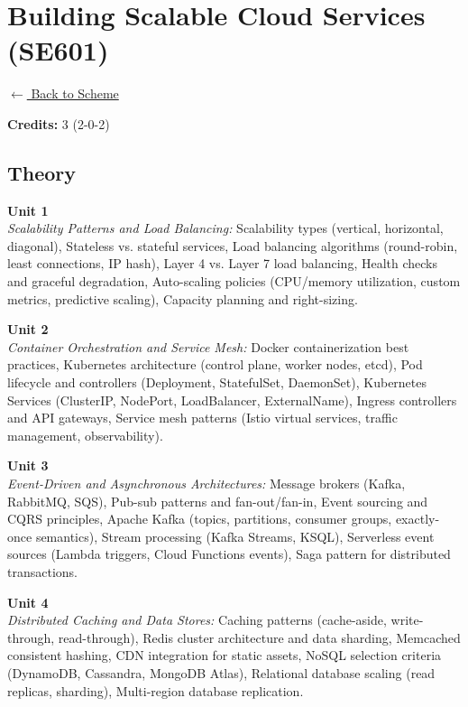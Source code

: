 \section*{Building Scalable Cloud Services (SE601)}
\label{major:SE_6}

\noindent \small{\hyperref[main:scheme]{$\leftarrow$ Back to Scheme}} \vspace{0.5cm}

\noindent \textbf{Credits:} 3 (2-0-2)

\subsection*{Theory}
\noindent\textbf{Unit 1} \\
\textit{Scalability Patterns and Load Balancing:} Scalability types (vertical, horizontal, diagonal), Stateless vs. stateful services, Load balancing algorithms (round-robin, least connections, IP hash), Layer 4 vs. Layer 7 load balancing, Health checks and graceful degradation, Auto-scaling policies (CPU/memory utilization, custom metrics, predictive scaling), Capacity planning and right-sizing.

\vspace{0.3cm}

\noindent\textbf{Unit 2} \\
\textit{Container Orchestration and Service Mesh:} Docker containerization best practices, Kubernetes architecture (control plane, worker nodes, etcd), Pod lifecycle and controllers (Deployment, StatefulSet, DaemonSet), Kubernetes Services (ClusterIP, NodePort, LoadBalancer, ExternalName), Ingress controllers and API gateways, Service mesh patterns (Istio virtual services, traffic management, observability).

\vspace{0.3cm}

\noindent\textbf{Unit 3} \\
\textit{Event-Driven and Asynchronous Architectures:} Message brokers (Kafka, RabbitMQ, SQS), Pub-sub patterns and fan-out/fan-in, Event sourcing and CQRS principles, Apache Kafka (topics, partitions, consumer groups, exactly-once semantics), Stream processing (Kafka Streams, KSQL), Serverless event sources (Lambda triggers, Cloud Functions events), Saga pattern for distributed transactions.

\vspace{0.3cm}

\noindent\textbf{Unit 4} \\
\textit{Distributed Caching and Data Stores:} Caching patterns (cache-aside, write-through, read-through), Redis cluster architecture and data sharding, Memcached consistent hashing, CDN integration for static assets, NoSQL selection criteria (DynamoDB, Cassandra, MongoDB Atlas), Relational database scaling (read replicas, sharding), Multi-region database replication.

